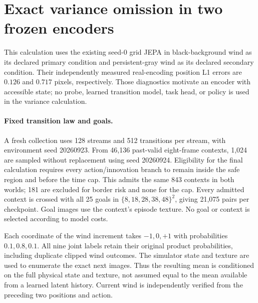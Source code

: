 \section{Exact variance omission in two frozen encoders}
\label{app:oracle-variance}

This calculation uses the existing seed-0 grid JEPA in black-background wind as its declared primary
condition and persistent-gray wind as its declared secondary condition. Their independently measured
real-encoding position L1 errors are $0.126$ and $0.717$ pixels, respectively. Those diagnostics motivate
an encoder with accessible state; no probe, learned transition model, task head, or policy is used
in the variance calculation.

\paragraph{Fixed transition law and goals.}
A fresh collection uses 128 streams and 512 transitions per stream, with environment seed 20260923.
From 46,136 past-valid eight-frame contexts, 1,024 are sampled without replacement using seed
20260924. Eligibility for the final calculation requires every action/innovation branch to remain
inside the safe region and before the time cap. This admits the same 843 contexts in both worlds;
181 are excluded for border risk and none for the cap. Every admitted context is crossed with all
25 goals in $\{8,18,28,38,48\}^2$, giving 21,075 pairs per checkpoint. Goal images use the context's
episode texture. No goal or context is selected according to model costs.

Each coordinate of the wind increment takes $-1,0,+1$ with probabilities $0.1,0.8,0.1$.
All nine joint labels retain their original product probabilities, including duplicate clipped
wind outcomes. The simulator state and texture are used to enumerate the exact next images.
Thus the resulting mean is conditioned on the full physical state and texture, not assumed equal
to the mean available from a learned latent history. Current wind is independently verified from
the preceding two positions and action.

